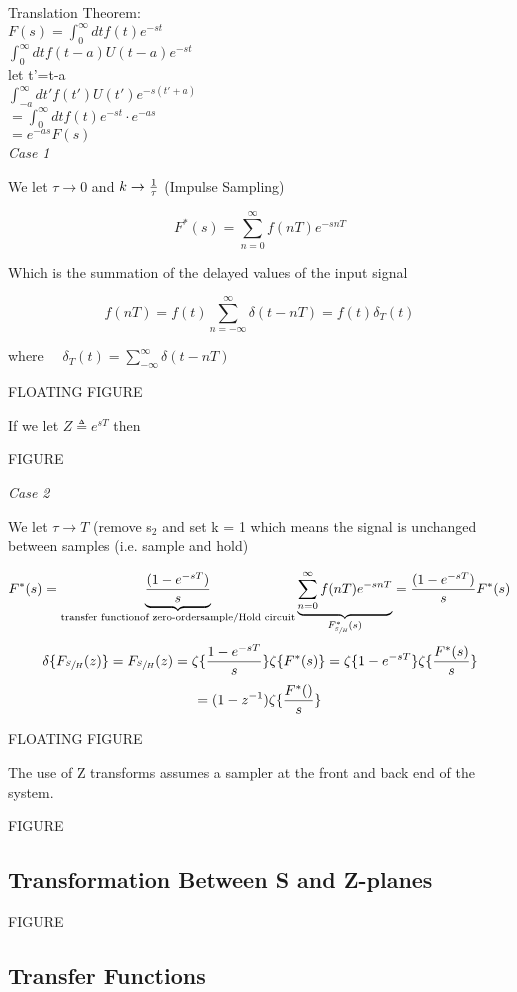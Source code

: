 \documentclass[11pt,fleqn]{book} %
\begin{document}
Translation Theorem:\\
$F(s)=\int_0^\infty dtf(t)e^{-st}$\\
$\int_0^\infty dtf(t-a)U(t-a)e^{-st}$\\
let t'=t-a\\
$\int_{-a}^\infty dt'f(t')U(t')e^{-s(t'+a)}$\\
$=\int_0^\infty dtf(t)e^{-st}\cdot e^{-as}$\\
$=e^{-as}F(s)$\\

\textit{Case 1}

We let $\tau\to 0$ and $k\to{1\over \tau}$ (Impulse Sampling)

$$F^*(s)=\sum_{n=0}^\infty f(nT)e^{-snT}$$

Which is the summation of the delayed values of the input signal

$$f(nT)=f(t)\sum_{n=-\infty}^\infty\delta(t-nT)=f(t)\delta_T(t)$$

where $\quad\delta_T(t)=\sum_{-\infty}^\infty\delta(t-nT)$

FLOATING FIGURE

If we let $Z\triangleq e^{sT}$ then

FIGURE

\textit{Case 2}

We let $\tau\to T$ (remove s$_2$ and set k = 1 which means the signal is unchanged between samples (i.e. sample and hold)

$$F^*(s)=\underbrace{(1-e^{-sT})\over s}_\text{transfer function\\ of zero-order\\ sample/Hold circuit}\underbrace{\sum_{n=0}^\infty f(nT)e^{-snT}}_{F_{\sfrac{S}{H}}^*(s)}={(1-e^{-sT})\over s}F^*(s)$$
$$\delta\{F_{\sfrac{S}{H}}(z)\}=F_{\sfrac{S}{H}}(z)=\zeta\{{1-e^{-sT}\over s}\}\zeta\{F^*(s)\}=\zeta\{1-e^{-sT}\}\zeta\{{F^*(s)\over s}\}$$
$$=(1-z^{-1})\zeta\{{F^*()\over s}\}$$

FLOATING FIGURE

The use of Z transforms assumes a sampler at the front and back end of the system.

FIGURE

\subsection{Transformation Between S and Z-planes}

FIGURE

\subsection{Transfer Functions}
\end{document}
